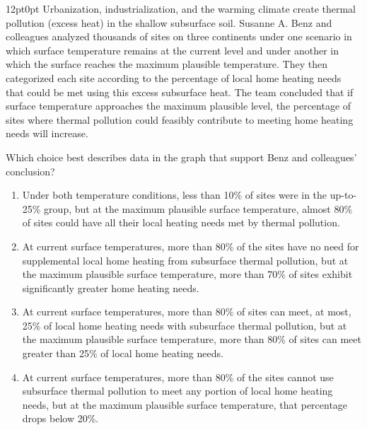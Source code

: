 \documentclass[11pt, twocolumn]{article}
\newcounter{questionnum}
\begin{document}
\vspace{6pt}\noindent
\begin{minipage}{\columnwidth}\raggedright
\noindent{}\par\vspace{8pt}
\begin{adjustwidth}{12pt}{0pt}
Urbanization, industrialization, and the warming climate create thermal pollution (excess heat) in the shallow subsurface soil. Susanne A. Benz and colleagues analyzed thousands of sites on three continents under one scenario in which surface temperature remains at the current level and under another in which the surface reaches the maximum plausible temperature. They then categorized each site according to the percentage of local home heating needs that could be met using this excess subsurface heat. The team concluded that if surface temperature approaches the maximum plausible level, the percentage of sites where thermal pollution could feasibly contribute to meeting home heating needs will increase.
\vspace{6pt}

Which choice best describes data in the graph that support Benz and colleagues' conclusion?
\begin{enumerate}[label=\Alph*),leftmargin=18pt,topsep=3pt,itemsep=2pt]
  \item Under both temperature conditions, less than 10\% of sites were in the up-to-25\% group, but at the maximum plausible surface temperature, almost 80\% of sites could have all their local heating needs met by thermal pollution.
  \item At current surface temperatures, more than 80\% of the sites have no need for supplemental local home heating from subsurface thermal pollution, but at the maximum plausible surface temperature, more than 70\% of sites exhibit significantly greater home heating needs.
  \item At current surface temperatures, more than 80\% of sites can meet, at most, 25\% of local home heating needs with subsurface thermal pollution, but at the maximum plausible surface temperature, more than 80\% of sites can meet greater than 25\% of local home heating needs.
  \item At current surface temperatures, more than 80\% of the sites cannot use subsurface thermal pollution to meet any portion of local home heating needs, but at the maximum plausible surface temperature, that percentage drops below 20\%.
\end{enumerate}
\end{adjustwidth}
\end{minipage}\par
\end{document}

